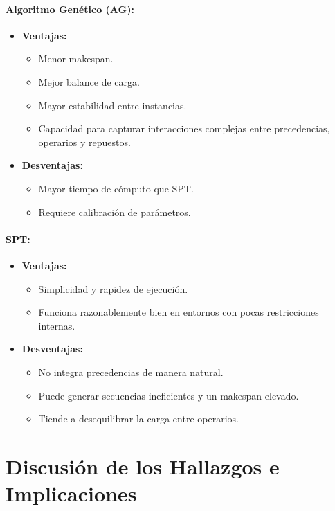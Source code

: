 \paragraph{Algoritmo Genético (AG):}  
\begin{itemize}
    \item \textbf{Ventajas:}
    \begin{itemize}
        \item Menor makespan.
        \item Mejor balance de carga.
        \item Mayor estabilidad entre instancias.
        \item Capacidad para capturar interacciones complejas entre precedencias, operarios y repuestos.
    \end{itemize}
    \item \textbf{Desventajas:}
    \begin{itemize}
        \item Mayor tiempo de cómputo que SPT.
        \item Requiere calibración de parámetros.
    \end{itemize}
\end{itemize}

\paragraph{SPT:}
\begin{itemize}
    \item \textbf{Ventajas:}
    \begin{itemize}
        \item Simplicidad y rapidez de ejecución.
        \item Funciona razonablemente bien en entornos con pocas restricciones internas.
    \end{itemize}
    \item \textbf{Desventajas:}
    \begin{itemize}
        \item No integra precedencias de manera natural.
        \item Puede generar secuencias ineficientes y un makespan elevado.
        \item Tiende a desequilibrar la carga entre operarios.
    \end{itemize}
\end{itemize}

\section{Discusión de los Hallazgos e Implicaciones}

